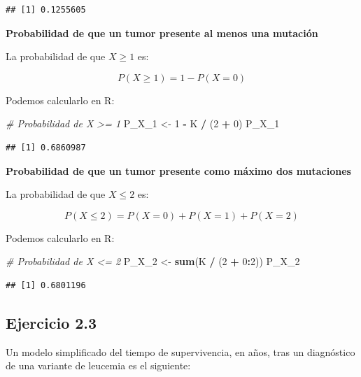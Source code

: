 \documentclass[
]{article}
\newenvironment{Shaded}{\begin{snugshade}}{\end{snugshade}}
\newcommand{\CommentTok}[1]{\textcolor[rgb]{0.56,0.35,0.01}{\textit{#1}}}
\newcommand{\DecValTok}[1]{\textcolor[rgb]{0.00,0.00,0.81}{#1}}
\newcommand{\FunctionTok}[1]{\textcolor[rgb]{0.13,0.29,0.53}{\textbf{#1}}}
\newcommand{\NormalTok}[1]{#1}
\newcommand{\OtherTok}[1]{\textcolor[rgb]{0.56,0.35,0.01}{#1}}
\newcommand{\SpecialCharTok}[1]{\textcolor[rgb]{0.81,0.36,0.00}{\textbf{#1}}}
\begin{document}
\begin{verbatim}
## [1] 0.1255605
\end{verbatim}

\textbf{Probabilidad de que un tumor presente al menos una mutación}

La probabilidad de que \(X \geq 1\) es:

\[
P(X \geq 1) = 1 - P(X = 0)
\]

Podemos calcularlo en R:

\begin{Shaded}
\begin{Highlighting}[]
\CommentTok{\# Probabilidad de X \textgreater{}= 1}
\NormalTok{P\_X\_1 }\OtherTok{\textless{}{-}} \DecValTok{1} \SpecialCharTok{{-}}\NormalTok{ K }\SpecialCharTok{/}\NormalTok{ (}\DecValTok{2} \SpecialCharTok{+} \DecValTok{0}\NormalTok{)}
\NormalTok{P\_X\_1}
\end{Highlighting}
\end{Shaded}

\begin{verbatim}
## [1] 0.6860987
\end{verbatim}

\textbf{Probabilidad de que un tumor presente como máximo dos mutaciones}

La probabilidad de que \(X \leq 2\) es:

\[
P(X \leq 2) = P(X = 0) + P(X = 1) + P(X = 2)
\]

Podemos calcularlo en R:

\begin{Shaded}
\begin{Highlighting}[]
\CommentTok{\# Probabilidad de X \textless{}= 2}
\NormalTok{P\_X\_2 }\OtherTok{\textless{}{-}} \FunctionTok{sum}\NormalTok{(K }\SpecialCharTok{/}\NormalTok{ (}\DecValTok{2} \SpecialCharTok{+} \DecValTok{0}\SpecialCharTok{:}\DecValTok{2}\NormalTok{))}
\NormalTok{P\_X\_2}
\end{Highlighting}
\end{Shaded}

\begin{verbatim}
## [1] 0.6801196
\end{verbatim}

\subsection{Ejercicio 2.3}\label{ejercicio-2.3}

Un modelo simplificado del tiempo de supervivencia, en años, tras un diagnóstico de una variante de leucemia es el siguiente:
\end{document}
